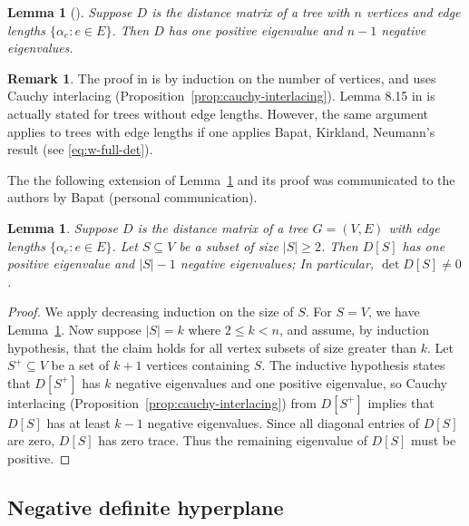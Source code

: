 \documentclass[12pt]{amsart}
\newtheorem{lem}[thm]{Lemma}
\theoremstyle{definition}
\newtheorem{rmk}[thm]{Remark}
\newcommand{\Da}{{D}}
\begin{document}
\begin{lem}[{\cite[Lemma 8.15]{bapat}}]
\label{lem:dist-signature}
Suppose $\Da$ is the distance matrix of a tree with $n$ vertices and edge lengths $\{\alpha_e \colon e \in E\}$. 
Then $\Da$ has one positive eigenvalue and $n - 1$ negative eigenvalues.
\end{lem}
\begin{rmk}
The proof in \cite{bapat} is by induction on the number of vertices, and uses Cauchy interlacing (Proposition~\ref{prop:cauchy-interlacing}). Lemma 8.15 in \cite{bapat} is actually stated for trees without edge lengths. However, the same argument applies to trees with edge lengths if one applies Bapat, Kirkland, Neumann's result \cite[Corollary 2.5]{bapat-kirkland-neumann} (see \eqref{eq:w-full-det}). 
\end{rmk}
The the following extension of Lemma~\ref{lem:dist-signature} and its proof was communicated to the authors by Bapat (personal communication).
\begin{lem}
\label{lem:distance-sub-nonsingular}
Suppose $\Da$ is the distance matrix of a tree $G = (V,E)$ with edge lengths $\{\alpha_e \colon e \in E\}$. Let $S \subseteq V$ be a subset of size $|S| \geq 2$. 
Then
$\Da[S]$ has one positive eigenvalue and $|S| - 1$ negative eigenvalues;
In particular, $\det \Da[S] \neq 0$.
\end{lem}
\begin{proof}
We apply decreasing induction on the size of $S$. 
For $S = V$, we have Lemma~\ref{lem:dist-signature}.
Now suppose $|S| = k$ where $2 \leq k < n$, and assume, by induction hypothesis, 
that the claim holds for all vertex subsets of size greater than $k$.
Let $S^+ \subseteq V$ be a set of $k + 1$ vertices containing $S$.
The inductive hypothesis states that $D[S^+]$ has $k$ negative eigenvalues and one positive eigenvalue,
so Cauchy interlacing (Proposition~\ref{prop:cauchy-interlacing}) from $D[S^+]$ implies that $D[S]$ has at least $k - 1$ negative eigenvalues. 
Since all diagonal entries of $D[S]$ are zero, $D[S]$ has zero trace. 
Thus the remaining eigenvalue of $D[S]$ must be positive.
\end{proof}

\subsection{Negative definite hyperplane}
\end{document}
